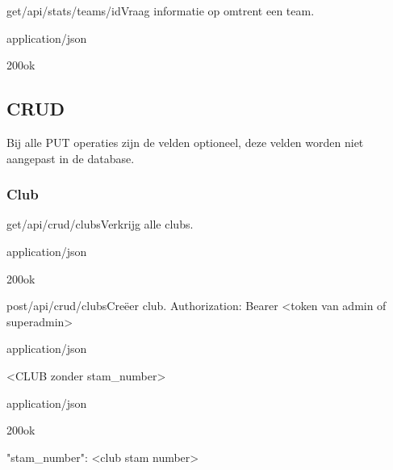 \documentclass[10pt]{article}
\begin{document}
\begin{apiRoute}{get}{/api/stats/teams/id}{Vraag informatie op omtrent een team.}
	\begin{routeParameter}
	\end{routeParameter}

	\begin{routeResponse}{application/json}
		\begin{routeResponseItem}{200}{ok}
			\begin{routeResponseItemBody}
			\end{routeResponseItemBody}
		\end{routeResponseItem}
	\end{routeResponse}
\end{apiRoute}

\subsection{CRUD}

Bij alle PUT operaties zijn de velden optioneel, deze velden worden niet aangepast in de database.

\subsubsection{Club}

\begin{apiRoute}{get}{/api/crud/clubs}{Verkrijg alle clubs.}
	\begin{routeResponse}{application/json}
		\begin{routeResponseItem}{200}{ok}
			\begin{routeResponseItemBody}
[
	<CLUB>, ...
]
\end{routeResponseItemBody}
		\end{routeResponseItem}
	\end{routeResponse}
\end{apiRoute}

\begin{apiRoute}{post}{/api/crud/clubs}{Creëer club.}
 Authorization: Bearer <token van admin of superadmin>
	\begin{routeRequest}{application/json}
		\begin{routeRequestBody}
<CLUB zonder stam_number>
		\end{routeRequestBody}
	\end{routeRequest}

	\begin{routeResponse}{application/json}
		\begin{routeResponseItem}{200}{ok}
			\begin{routeResponseItemBody}
{
	"stam_number": <club stam number>
}
			\end{routeResponseItemBody}
		\end{routeResponseItem}
	\end{routeResponse}
\end{apiRoute}
\end{document}
